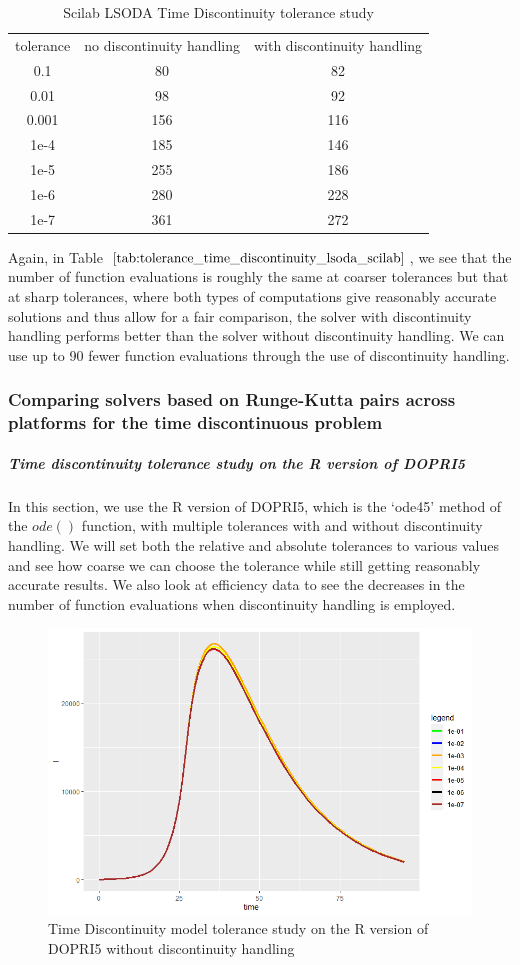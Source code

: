 \begin{table}[H]
\caption {Scilab LSODA Time Discontinuity tolerance study} 
\label{tab:tolerance_time_discontinuity_lsoda_scilab} 
\begin{center}
\begin{tabular}{ c c c }
tolerance & no discontinuity handling & with discontinuity handling \\ 
0.1 & 80 & 82 \\
0.01 & 98 & 92 \\
0.001 & 156 & 116 \\
1e-4 & 185 & 146 \\
1e-5 & 255 & 186 \\
1e-6 & 280 & 228 \\
1e-7 & 361 & 272 \\
\end{tabular}
\end{center}
\end{table}
Again, in Table $\ref{tab:tolerance_time_discontinuity_lsoda_scilab}$, we see that the number of function evaluations is roughly the same at coarser tolerances but that at sharp tolerances, where both types of computations give reasonably accurate solutions and thus allow for a fair comparison, the solver with discontinuity handling performs better than the solver without discontinuity handling. We can use up to 90 fewer function evaluations through the use of discontinuity handling. 

\subsubsection{Comparing solvers based on Runge-Kutta pairs across platforms for the time discontinuous problem}
\subparagraph{Time discontinuity tolerance study on the R version of DOPRI5}
In this section, we use the R version of DOPRI5, which is the `ode45' method of the $ode()$ function, with multiple tolerances with and without discontinuity handling. We will set both the relative and absolute tolerances to various values and see how coarse we can choose the tolerance while still getting reasonably accurate results. We also look at efficiency data to see the decreases in the number of function evaluations when discontinuity handling is employed.

\begin{figure}[H]
\centering
\includegraphics[width=0.7\linewidth]{./figures/tolerance_time_rk45_no_event_R}
\caption{Time Discontinuity model tolerance study on the R version of DOPRI5 without discontinuity handling}
\label{fig:tolerance_time_rk45_no_event_R}
\end{figure}

